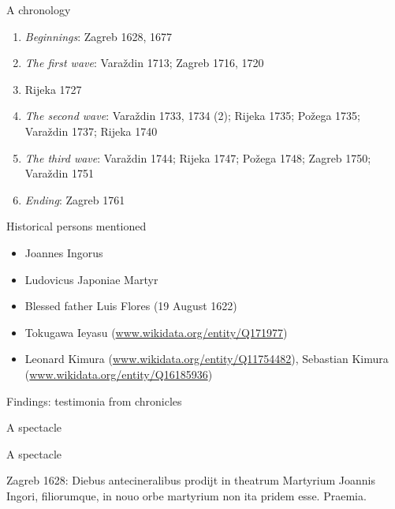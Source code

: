 \documentclass[14pt]{beamer}
\begin{document}
\begin{frame}{A chronology}

\begin{enumerate}
\item \emph{Beginnings}: Zagreb 1628, 1677
\item \emph{The first wave}: Varaždin 1713; Zagreb 1716, 1720
\item Rijeka 1727
\item \emph{The second wave}: Varaždin 1733, 1734 (2); Rijeka 1735; Požega 1735; Varaždin 1737; Rijeka 1740
\item \emph{The third wave}: Varaždin 1744; Rijeka 1747; Požega 1748; Zagreb 1750; Varaždin 1751
\item \emph{Ending}: Zagreb 1761
\end{enumerate}

\end{frame}

\begin{frame}{Historical persons mentioned}

\begin{itemize}
\item Joannes Ingorus
\item Ludovicus Japoniae Martyr
\item Blessed father Luis Flores (19 August 1622)
\item Tokugawa Ieyasu (\href{http://www.wikidata.org/entity/Q171977}{www.wikidata.org/entity/Q171977})
\item Leonard Kimura (\href{http://www.wikidata.org/entity/Q11754482}{www.wikidata.org/entity/Q11754482}), Sebastian Kimura (\href{https://www.wikidata.org/entity/Q16185936}{www.wikidata.org/entity/Q16185936})
\end{itemize}

\end{frame}

\begin{frame}{Findings: testimonia from chronicles}

A spectacle


\end{frame}

\begin{frame}{A spectacle}

\alert{Zagreb 1628}: Diebus antecineralibus prodijt in theatrum Martyrium Joannis Ingori, filiorumque, in nouo orbe martyrium non ita pridem esse. Praemia.

\end{frame}
\end{document}
